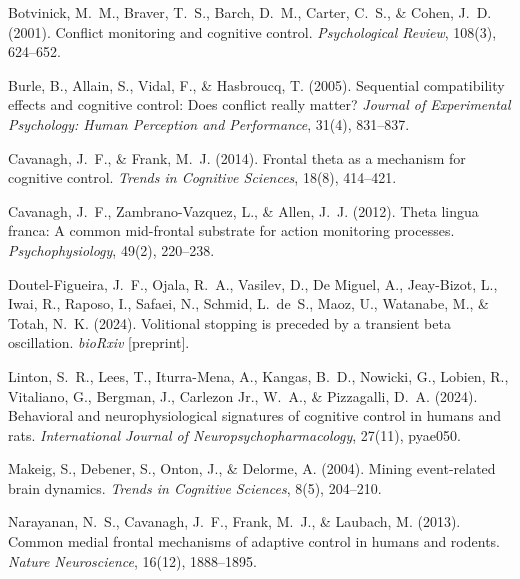 \documentclass[11pt]{article}
\begin{document}

\begin{thebibliography}{99}

Botvinick, M.~M., Braver, T.~S., Barch, D.~M., Carter, C.~S., \& Cohen, J.~D. (2001).
\newblock Conflict monitoring and cognitive control.
\newblock \emph{Psychological Review}, 108(3), 624--652.

Burle, B., Allain, S., Vidal, F., \& Hasbroucq, T. (2005).
\newblock Sequential compatibility effects and cognitive control: Does conflict really matter?
\newblock \emph{Journal of Experimental Psychology: Human Perception and Performance}, 31(4), 831--837.


Cavanagh, J.~F., \& Frank, M.~J. (2014).
\newblock Frontal theta as a mechanism for cognitive control.
\newblock \emph{Trends in Cognitive Sciences}, 18(8), 414--421.

Cavanagh, J.~F., Zambrano-Vazquez, L., \& Allen, J.~J. (2012).
\newblock Theta lingua franca: A common mid-frontal substrate for action monitoring processes.
\newblock \emph{Psychophysiology}, 49(2), 220--238.


Doutel-Figueira, J.~F., Ojala, R.~A., Vasilev, D., De Miguel, A., Jeay-Bizot, L., Iwai, R., Raposo, I., Safaei, N., Schmid, L.~de~S., Maoz, U., Watanabe, M., \& Totah, N.~K. (2024).
\newblock Volitional stopping is preceded by a transient beta oscillation.
\newblock \emph{bioRxiv} [preprint].

Linton, S.~R., Lees, T., Iturra-Mena, A., Kangas, B.~D., Nowicki, G., Lobien, R., Vitaliano, G., Bergman, J., Carlezon Jr., W.~A., \& Pizzagalli, D.~A. (2024).
\newblock Behavioral and neurophysiological signatures of cognitive control in humans and rats.
\newblock \emph{International Journal of Neuropsychopharmacology}, 27(11), pyae050.


Makeig, S., Debener, S., Onton, J., \& Delorme, A. (2004).
\newblock Mining event-related brain dynamics.
\newblock \emph{Trends in Cognitive Sciences}, 8(5), 204--210.

Narayanan, N.~S., Cavanagh, J.~F., Frank, M.~J., \& Laubach, M. (2013).
\newblock Common medial frontal mechanisms of adaptive control in humans and rodents.
\newblock \emph{Nature Neuroscience}, 16(12), 1888--1895.


\end{thebibliography}
\end{document}
